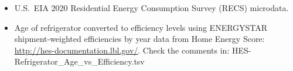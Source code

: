 \begin{itemize}
\item U.S.~EIA 2020 Residential Energy Consumption Survey (RECS) microdata.
\item Age of refrigerator converted to efficiency levels using ENERGYSTAR shipment-weighted efficiencies by year data from Home Energy Score: \href{http://hes-documentation.lbl.gov/}{http://hes-documentation.lbl.gov/}. Check the comments in: HES-Refrigerator_Age_vs_Efficiency.tsv
\end{itemize}
